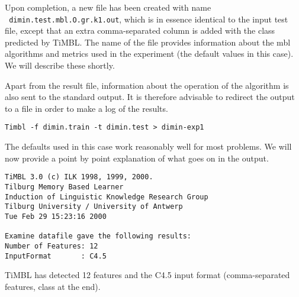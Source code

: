 \documentclass{report}
\begin{document}
Upon completion, a new file has been created with name\\ {\tt
dimin.test.mbl.O.gr.k1.out}, which is in essence identical to the
input test file, except that an extra comma-separated column is added
with the class predicted by TiMBL. The name of the file provides
information about the {\sc mbl} algorithms and metrics used in the
experiment (the default values in this case). We will describe these
shortly.

Apart from the result file, information about the operation of the
algorithm is also sent to the standard output. It is therefore 
advisable to redirect the output to a file in order to make a log of
the results.

{\small
\begin{verbatim}
Timbl -f dimin.train -t dimin.test > dimin-exp1
\end{verbatim}
}

The defaults used in this case work reasonably well for most problems.  We
will now provide a point by point explanation of what goes on in the
output.\\

\vspace{1cm}

\hline

{\small
\begin{verbatim}
TiMBL 3.0 (c) ILK 1998, 1999, 2000.
Tilburg Memory Based Learner
Induction of Linguistic Knowledge Research Group
Tilburg University / University of Antwerp
Tue Feb 29 15:23:16 2000
 
Examine datafile gave the following results:
Number of Features: 12
InputFormat       : C4.5               
\end{verbatim}
}

\hline
\vspace{1cm}

TiMBL has detected 12 features and the C4.5 input format
(comma-separated features, class at the end).

\vspace{2cm}
\hline
\end{document}
